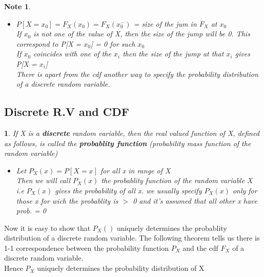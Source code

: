 \documentclass[11pt]{article}
\newtheorem*{note}{Note}
\newtheorem{definition}{\framebox{DEF}}[section]
\begin{document}
\begin{note}
\begin{enumerate}
\begin{itemize}
                                    \item $P[X = x_0] = F_X(x_0) = F_X(x_0^-)$ = size of the jum in $F_X$ at $x_0 $ \\
                                            If $x_0$ is not one of the value of X, then the size of the jump will be 0. This correspond to P[X = $x_0$] = 0 for such $x_0$\\
                                            If $x_0$ coincides with one of the $x_i$ then the size of the jump at that $x_i$ gives P[X = $x_i$]\\
                                            There is apart from the cdf another way to specify the probability distribution of a discrete random variable. 
                                \end{itemize}
                \end{enumerate}

            \end{note}
        \subsection{Discrete R.V and CDF}
            \begin{definition}
                If X is a \textbf{discrete} random variable, then the real valued function of X, defined as follows, is called the \textbf{probablity function} (probability mass function of the random variable)
                \begin{itemize}
                    \item Let $P_X(x) = P[X = x]$ for all x in range of X \\
                            Then we will call $P_X(x)$ the probablity function of the random variable X \\
                            i.e $P_X(x)$ gives the probability of all x. we usually specify $P_X(x)$ only for those x for wich the probablity is $>$ 0 and it's assumed that all other x have prob. = 0
                \end{itemize}
            \end{definition}
            Now it is easy to show that $P_X()$ uniquely determines the probablity distribution of a discrete random variable.
            The following theorem tells us there is 1-1 correspondence between the probability function $P_X$ and the cdf $F_X$ of a discrete random variable. \\
            Hence $P_X$ uniquely determines the probability distribution of X
\end{document}
